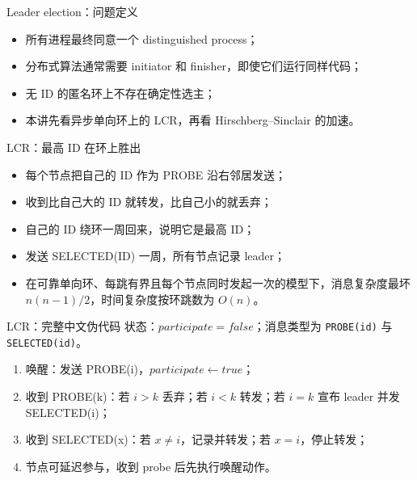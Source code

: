 \documentclass[UTF8,fontset=none,aspectratio=169,10pt]{beamer}
\begin{document}
{

\begin{frame}{Leader election：问题定义}
\begin{itemize}
  \item 所有进程最终同意一个 distinguished process；
  \item 分布式算法通常需要 initiator 和 finisher，即使它们运行同样代码；
  \item 无 ID 的匿名环上不存在确定性选主；
  \item 本讲先看异步单向环上的 LCR，再看 Hirschberg--Sinclair 的加速。
\end{itemize}
\end{frame}

\begin{frame}{LCR：最高 ID 在环上胜出}
\begin{itemize}
  \item 每个节点把自己的 ID 作为 PROBE 沿右邻居发送；
  \item 收到比自己大的 ID 就转发，比自己小的就丢弃；
  \item 自己的 ID 绕环一周回来，说明它是最高 ID；
  \item 发送 SELECTED(ID) 一周，所有节点记录 leader；
  \item 在可靠单向环、每跳有界且每个节点同时发起一次的模型下，消息复杂度最坏 $n(n-1)/2$，时间复杂度按环跳数为 $O(n)$。
\end{itemize}
\end{frame}

\begin{frame}{LCR：完整中文伪代码}
\scriptsize
状态：$participate=false$；消息类型为 \texttt{PROBE(id)} 与 \texttt{SELECTED(id)}。
\begin{enumerate}
  \item 唤醒：发送 PROBE(i)，$participate\leftarrow true$；
  \item 收到 PROBE(k)：若 $i>k$ 丢弃；若 $i<k$ 转发；若 $i=k$ 宣布 leader 并发 SELECTED(i)；
  \item 收到 SELECTED(x)：若 $x\neq i$，记录并转发；若 $x=i$，停止转发；
  \item 节点可延迟参与，收到 probe 后先执行唤醒动作。
\end{enumerate}
\normalsize
\end{frame}

}
\end{document}
